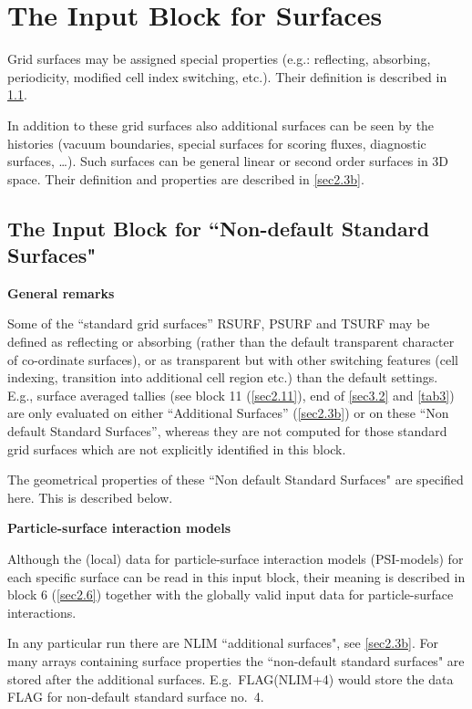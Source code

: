 \section{The Input Block for Surfaces}
\label{sec2.3}
Grid surfaces may be assigned special properties (e.g.: reflecting, absorbing,
periodicity, modified cell index switching, etc.).
Their definition is described in \cref{sec2.3a}.

In addition to these grid surfaces also additional surfaces can be seen by the
histories (vacuum boundaries, special surfaces for scoring fluxes, diagnostic
surfaces, \dots).
Such surfaces can be general linear or second order surfaces in 3D space.
Their definition and properties are described in \cref{sec2.3b}.

\subsection{The Input Block for ``Non-default Standard Surfaces"}
\label{sec2.3a}

\textbf{General remarks} 

\medskip 

Some of the ``standard grid surfaces'' RSURF, PSURF and TSURF may be defined as
reflecting or absorbing (rather than the default transparent character of
co-ordinate surfaces), or as transparent but with other switching features
(cell indexing, transition into additional cell region etc.) than the default
settings.
E.g., surface averaged tallies (see block 11 (\cref{sec2.11}), end of
\cref{sec3.2} and \cref{tab3}) are only evaluated on either ``Additional
Surfaces'' (\cref{sec2.3b}) or on these ``Non default Standard Surfaces'',
whereas they are not computed for those standard grid surfaces which are not
explicitly identified in this block.

The geometrical properties of these ``Non default Standard Surfaces" are
specified here.
This is described below.

\textbf{Particle-surface interaction models} 

Although the (local) data for particle-surface interaction models (PSI-models)
for each specific surface can be read in this input block, their meaning is
described in block 6 (\cref{sec2.6}) together with the globally valid input
data for particle-surface interactions.

In any particular run there are NLIM ``additional surfaces", see
\cref{sec2.3b}.
For many arrays containing surface properties the ``non-default standard
surfaces" are stored after the additional surfaces.
E.g.\ FLAG(NLIM+4) would store the data FLAG for non-default standard surface
no.\ 4.


